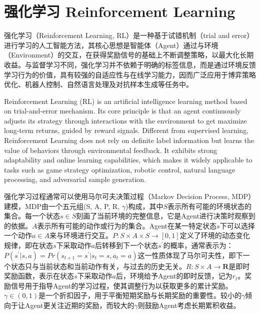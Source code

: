 \section{强化学习 Reinforcement Learning}

强化学习（Reinforcement Learning, RL）是一种基于试错机制（trial and error）进行学习的人工智能方法，其核心思想是智能体（Agent）通过与环境（Environment）的交互，在获得奖励信号的基础上不断调整策略，以最大化长期收益。与监督学习不同，强化学习并不依赖于明确的标签信息，而是通过环境反馈学习行为的价值，具有较强的自适应性与在线学习能力，因而广泛应用于博弈策略优化、机器人控制、自然语言处理及对抗样本生成等任务中。

Reinforcement Learning (RL) is an artificial intelligence learning method based on trial-and-error mechanism. Its core principle is that an agent continuously adjusts its strategy through interactions with the environment to get maximize long-term returns, guided by reward signals. Different from supervised learning, Reinforcement Learning does not rely on definite label information but learns the value of behaviors through environmental feedback. It exhibits strong adaptability and online learning capabilities, which makes it widely applicable to tasks such as game strategy optimization, robotic control, natural language processing, and adversarial sample generation.

强化学习过程通常可以使用马尔可夫决策过程（Markov Decision Process, MDP）建模，MDP由一个五元组(S, A, P, R, $\gamma$)构成，其中$S$表示所有可能的环境状态的集合。每一个状态$s\in S$刻画了当前环境的完整信息，它是Agent进行决策时观察到的依据。$A$表示所有可能的动作或行为的集合。Agent在某一特定状态$s$下可以选择一个动作$a\in A$来与环境进行交互。$P:S\times A\times S \to [0,1]$定义了环境的动态变化规律，即在状态$s$下采取动作$a$后转移到下一个状态$s^{'}$的概率，通常表示为：$P(s^{'}|s,a)=Pr(s_{t+1}=s^{'}|s_{t}=s,a_{t}=a)$这一性质体现了马尔可夫性，即下一个状态只与当前状态和当前动作有关，与过去的历史无关。$R:S\times A \to \mathbf{R}$是即时奖励函数，表示在状态$s$下采取动作$a$后，环境给予Agent的即时反馈，记为$r_{t}$。奖励信号用于指导Agent的学习过程，使其调整行为以获取更多的累计奖励。$\gamma \in (0,1)$是一个折扣因子，用于平衡短期奖励与长期奖励的重要性。较小的$\gamma$倾向于让Agent更关注近期的奖励，而较大的$\gamma$则鼓励Agent考虑长期累积收益。

